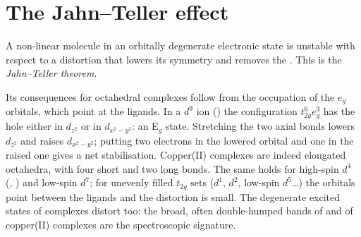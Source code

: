 \section{The Jahn--Teller effect}

\begin{theorem}\label{thm:b3:complex-spectra-magnetism:jahn-teller}
A non-linear molecule in an orbitally degenerate electronic state is unstable
with respect to a distortion that lowers its symmetry and removes the
. This is the \emph{Jahn--Teller theorem}.
\end{theorem}

\admitted

Its consequences for octahedral complexes follow from the occupation of the
$e_g$ orbitals, which point at the ligands. In a $d^9$ ion () the configuration
$t_{2g}^6e_g^3$ has the hole either in $d_{z^2}$ or in $d_{x^2-y^2}$: an E$_g$ state. Stretching the two axial
bonds lowers $d_{z^2}$ and raises $d_{x^2-y^2}$; putting two electrons in the lowered orbital
and one in the raised one gives a net stabilisation. Copper(II) complexes are
indeed elongated octahedra, with four short and two long bonds. The same holds
for high-spin $d^4$ (, ) and low-spin $d^7$; for unevenly filled $t_{2g}$ sets
($d^1$, $d^2$, low-spin $d^5$\dots) the orbitals point between the ligands and the
distortion is small. The degenerate excited states of complexes distort too: the
broad, often double-humped bands of  and of copper(II) complexes are
the spectroscopic signature.

